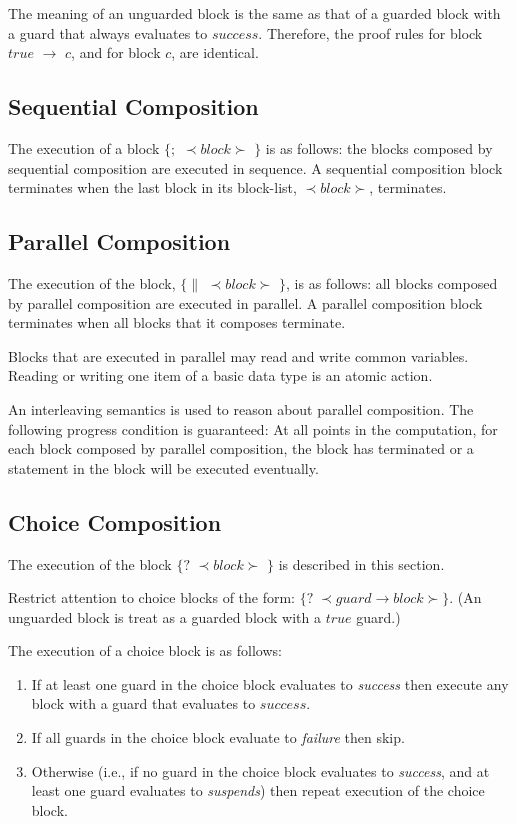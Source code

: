 The meaning of an unguarded block is the same as that of a guarded
block with a guard that always evaluates to $success$.
Therefore, the proof rules for block $true$ $\rightarrow$ $c$, and for
block $c$, are identical.


\subsection{Sequential Composition}
The execution of a block $\{;$ $\prec block \succ$ $\}$ is as follows: 
the blocks composed by sequential
composition are executed in sequence.
A sequential composition block terminates when the last block in its
block-list, $\prec block \succ$, terminates.


\subsection{Parallel Composition}
The execution of the block,  $\{\|$ $\prec block \succ$ $\}$, is 
as follows:
all blocks composed by parallel composition are executed in parallel.
A parallel composition block terminates when all blocks that it composes
terminate.

Blocks that are executed in parallel  may read and write common
variables.
Reading or writing one item of a basic data type is an atomic action.

An interleaving semantics is used to reason about parallel composition.
The following progress condition is guaranteed: 
At all points in the computation, for each block composed by 
parallel composition, the block has terminated or a statement
in the block will be executed eventually.


\subsection{Choice Composition}
The execution of the block  $\{?$  $\prec block \succ$ $\}$ is 
described in this section.

Restrict attention to choice blocks of the form:
$\{? \; \prec guard \rightarrow block \succ \}$.
(An unguarded block is treat as a guarded block with a $true$ guard.)

The execution of a choice block is as follows:
\begin{enumerate}
   \item If at least one guard in the choice block 
    evaluates to {\em success} then execute
   any block with a guard that evaluates to $success$.
   \item If all guards in the choice block evaluate to {\em failure} then skip.
   \item Otherwise (i.e., if no guard in the choice block evaluates 
   to {\em success},  and at least one guard
   evaluates to {\em suspends}) then repeat execution of the choice block.
\end{enumerate}

